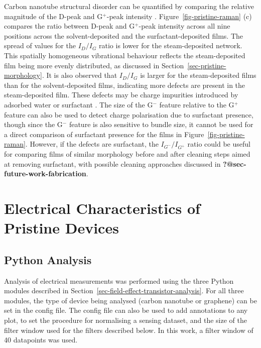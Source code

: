 \documentclass[
  a4paper,
]{scrbook}
\begin{document}
Carbon nanotube structural disorder can be quantified by comparing the
relative magnitude of the D-peak and G\(^+\)-peak intensity
\autocite{Dresselhaus2005,King2014}. Figure~\ref{fig-pristine-raman} (c)
compares the ratio between D-peak and G\(^+\)-peak intensity across all
nine positions across the solvent-deposited and the surfactant-deposited
films. The spread of values for the \(I_D/I_G\) ratio is lower for the
steam-deposited network. This spatially homogeneous vibrational
behaviour reflects the steam-deposited film being more evenly
distributed, as discussed in Section~\ref{sec-pristine-morphology}. It
is also observed that \(I_D/I_G\) is larger for the steam-deposited
films than for the solvent-deposited films, indicating more defects are
present in the steam-deposited film. These defects may be charge
impurities introduced by adsorbed water or surfactant
\autocite{Christensen2022}. The size of the G\(^-\) feature relative to
the G\(^+\) feature can also be used to detect charge polarisation due
to surfactant presence, though since the G\(^-\) feature is also
sensitive to bundle size, it cannot be used for a direct comparison of
surfactant presence for the films in Figure~\ref{fig-pristine-raman}.
However, if the defects are surfactant, the \(I_{G^-}/I_{G^+}\) ratio
could be useful for comparing films of similar morphology before and
after cleaning steps aimed at removing surfactant, with possible
cleaning approaches discussed in \textbf{?@sec-future-work-fabrication}.

\hypertarget{sec-pristine-electrical-characterisation}{%
\section{Electrical Characteristics of Pristine
Devices}\label{sec-pristine-electrical-characterisation}}

\hypertarget{sec-python-analysis}{%
\subsection{Python Analysis}\label{sec-python-analysis}}

Analysis of electrical measurements was performed using the three Python
modules described in Section~\ref{sec-field-effect-transistor-analysis}.
For all three modules, the type of device being analysed (carbon
nanotube or graphene) can be set in the config file. The config file can
also be used to add annotations to any plot, to set the procedure for
normalising a sensing dataset, and the size of the filter window used
for the filters described below. In this work, a filter window of 40
datapoints was used.
\end{document}
